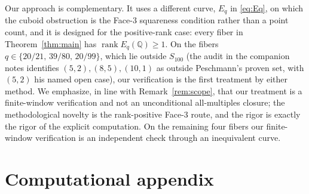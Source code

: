 \documentclass[11pt,reqno]{amsart}
\theoremstyle{plain}
\theoremstyle{definition}
\newcommand{\Q}{\mathbb{Q}}
\DeclareMathOperator{\rank}{rank}
\begin{document}
Our approach is complementary. It uses a different curve, $E_q$ in
\eqref{eq:Eq}, on which the cuboid obstruction is the Face-3 squareness
condition rather than a point count, and it is designed for the positive-rank
case: every fiber in Theorem~\ref{thm:main} has $\rank E_q(\Q)\ge1$. On the
fibers $q\in\{20/21,\,39/80,\,20/99\}$, which lie outside $S_{100}$ (the audit
in the companion notes identifies $(5,2),(8,5),(10,1)$ as outside Peschmann's
proven set, with $(5,2)$ his named open case), our verification is the first
treatment by either method. We emphasize, in line with
Remark~\ref{rem:scope}, that our treatment is a finite-window verification and
not an unconditional all-multiples closure; the methodological novelty is the
rank-positive Face-3 route, and the rigor is exactly the rigor of the explicit
computation. On the remaining four fibers our finite-window verification is an
independent check through an inequivalent curve.

\section{Computational appendix}
\end{document}
